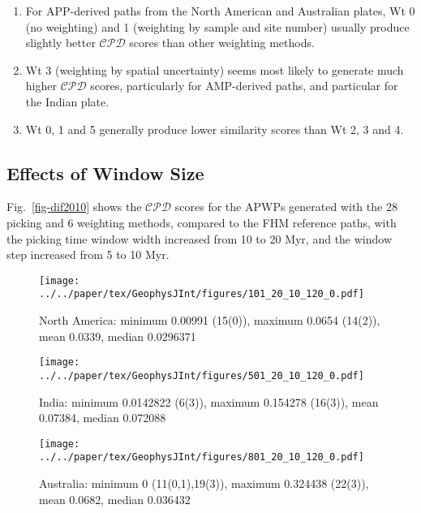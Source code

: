 %
\begin{enumerate}
  \item For APP-derived paths from the North American and Australian plates, Wt
    0 (no weighting) and 1 (weighting by sample and site number) usually produce
    slightly better $\mathcal{CPD}$ scores than other weighting methods.
  \item Wt 3 (weighting by spatial uncertainty) seems most likely to generate
    much higher $\mathcal{CPD}$ scores, particularly for AMP-derived paths, and
    particular for the Indian plate.
  \item Wt 0, 1 and 5 generally produce lower similarity scores than Wt 2, 3 and
    4.
\end{enumerate}

\subsection{Effects of Window Size}\label{sec:winsiz}

Fig.~\ref{fig-dif2010} shows the $\mathcal{CPD}$ scores for the APWPs generated
with the 28 picking and 6 weighting methods, compared to the FHM reference
paths, with the picking time window width increased from 10 to 20 Myr, and the
window step increased from 5 to 10 Myr.

\begin{figure*}
	\centering
	\begin{subfigure}{.96\textwidth}
		\texttt{[image: ../../paper/tex/GeophysJInt/figures/101\_20\_10\_120\_0.pdf]}
		\caption{North America: minimum 0.00991 (15(0)),
		maximum 0.0654 (14(2)), mean 0.0339, median 0.0296371}\label{fig-na-dif2010}
	\end{subfigure}
	\vspace{.1em}
	\begin{subfigure}{.96\textwidth}
		\texttt{[image: ../../paper/tex/GeophysJInt/figures/501\_20\_10\_120\_0.pdf]}
		\caption{India: minimum 0.0142822 (6(3)), maximum 0.154278 (16(3)),
		mean 0.07384, median 0.072088}\label{fig-in-dif2010}
	\end{subfigure}
	\vspace{.1em}
	\begin{subfigure}{.96\textwidth}
		\texttt{[image: ../../paper/tex/GeophysJInt/figures/801\_20\_10\_120\_0.pdf]}
		\caption{Australia: minimum 0 (11(0,1),19(3)), maximum
		0.324438 (22(3)), mean 0.0682, median 0.036432}\label{fig-au-dif2010}
	\end{subfigure}
	\caption[$\mathcal{CPD}$ of each plate's paleomagnetic APWPs vs its FHM
predicted APWP (20/10 Myr window/step)]{As Fig.~\ref{fig-dif}, here the paths
are generated in 20/10 Myr bin/step. The difference values less than
one-standard-deviation interval of the whole 168 values are colored in green,
more than one-standard-deviation interval colored in red. Compare the numbers of
picked paleopoles with those in Fig.~\ref{fig-dif}.}\label{fig-dif2010}
\end{figure*}


